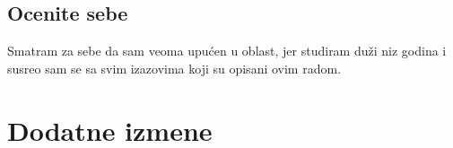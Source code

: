 \documentclass[a4paper]{report}
\begin{document}
\section{Ocenite sebe}
Smatram za sebe da sam veoma upućen u oblast, jer studiram duži niz godina i susreo sam se sa svim izazovima koji su opisani ovim radom.


\chapter{Dodatne izmene}
\end{document}
